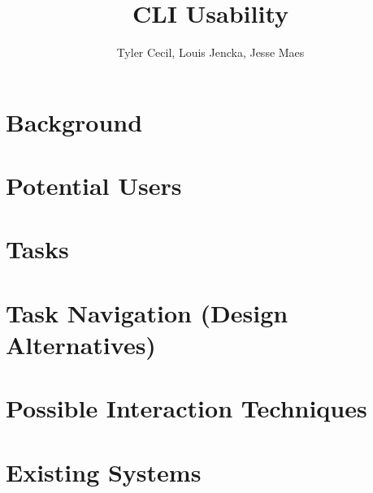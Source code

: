 \documentclass{article}
\title{CLI Usability}
\author{Tyler Cecil, Louis Jencka, Jesse Maes}
\begin{document}
\maketitle{}
\section{Background}
\label{sec:background}


% 

\section{Potential Users}
\label{sec:users}


\section{Tasks}
\label{sec:tasks}


\section{Task Navigation (Design Alternatives)}
\label{sec:tas_nav}


\section{Possible Interaction Techniques}
\label{sec:interact}


\section{Existing Systems}
\label{sec:existing}


\end{document}
